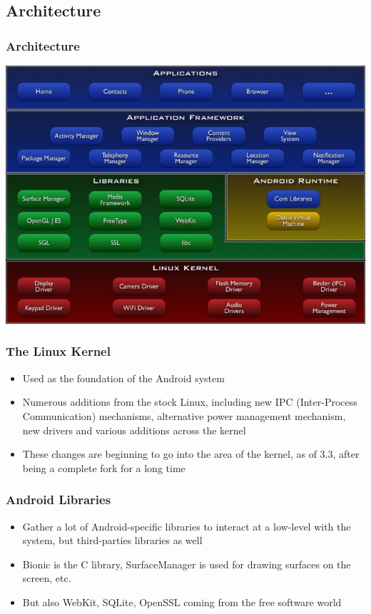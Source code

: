\subsection{Architecture}
\begin{frame}
  \frametitle{Architecture}
  \begin{center}
    \includegraphics[width=\textwidth]{slides/android-introduction-architecture/architecture.jpg}
  \end{center}
\end{frame}

\begin{frame}
  \frametitle{The Linux Kernel}
  \begin{itemize}
  \item Used as the foundation of the Android system
  \item Numerous additions from the stock Linux, including new IPC (Inter-Process Communication) mechanisms,
    alternative power management mechanism, new drivers and various
    additions across the kernel
  \item These changes are beginning to go into the 
    area of the kernel, as of 3.3, after being a complete fork for a
    long time
  \end{itemize}
\end{frame}

\begin{frame}
  \frametitle{Android Libraries}
  \begin{itemize}
  \item Gather a lot of Android-specific libraries to interact at a
    low-level with the system, but third-parties libraries as well
  \item Bionic is the C library, SurfaceManager is used for drawing
    surfaces on the screen, etc.
  \item But also WebKit, SQLite, OpenSSL coming from the free software
    world
  \end{itemize}
\end{frame}

